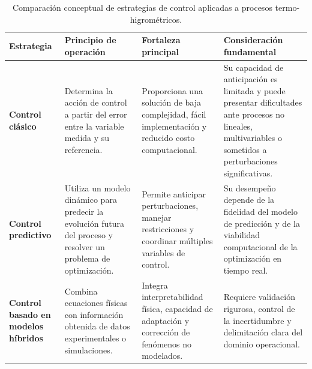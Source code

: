 \begin{table}[h!]
\centering
\caption{Comparación conceptual de estrategias de control aplicadas a procesos termo-higrométricos.}
\label{tab:comparacion_estrategias_control}
\renewcommand{\arraystretch}{1.45}
\setlength{\tabcolsep}{7pt}

\begin{tabular}{
>{\centering\arraybackslash}p{}
>{\raggedright\arraybackslash}p{}
>{\raggedright\arraybackslash}p{}
>{\raggedright\arraybackslash}p{}
}
\toprule
\textbf{Estrategia}
&
\textbf{Principio de operación}
&
\textbf{Fortaleza principal}
&
\textbf{Consideración fundamental}
\\
\midrule

\cellcolor{blue!8}
\textbf{Control clásico}
&
Determina la acción de control a partir del error entre la variable medida y su referencia.
&
Proporciona una solución de baja complejidad, fácil implementación y reducido costo computacional.
&
Su capacidad de anticipación es limitada y puede presentar dificultades ante procesos no lineales, multivariables o sometidos a perturbaciones significativas.
\\

\addlinespace[0.15cm]

\cellcolor{green!8}
\textbf{Control predictivo}
&
Utiliza un modelo dinámico para predecir la evolución futura del proceso y resolver un problema de optimización.
&
Permite anticipar perturbaciones, manejar restricciones y coordinar múltiples variables de control.
&
Su desempeño depende de la fidelidad del modelo de predicción y de la viabilidad computacional de la optimización en tiempo real.
\\

\addlinespace[0.15cm]

\cellcolor{orange!10}
\textbf{Control basado en modelos híbridos}
&
Combina ecuaciones físicas con información obtenida de datos experimentales o simulaciones.
&
Integra interpretabilidad física, capacidad de adaptación y corrección de fenómenos no modelados.
&
Requiere validación rigurosa, control de la incertidumbre y delimitación clara del dominio operacional.
\\

\bottomrule
\end{tabular}
\end{table}



